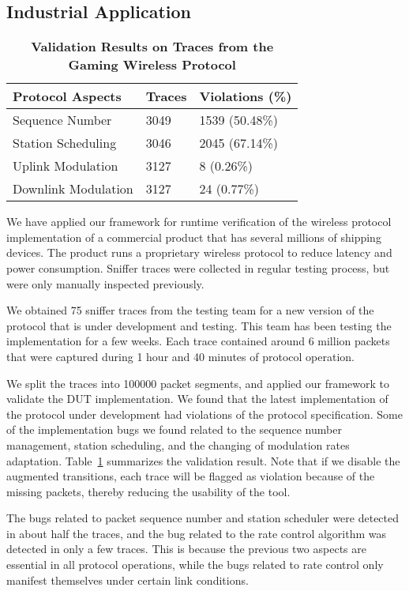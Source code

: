 \subsection{Industrial Application}
\label{subsec:xbox}

\begin{table}[t!]
  \centering
  \begin{tabular}{lll}
    \toprule
    \textbf{Protocol Aspects} & \textbf{Traces} & \textbf{Violations (\%)}\\
    \midrule
    Sequence Number & 3049 & 1539 (50.48\%) \\
    Station Scheduling & 3046 & 2045 (67.14\%) \\
    Uplink Modulation & 3127 & 8 (0.26\%) \\
    Downlink Modulation & 3127 & 24 (0.77\%) \\
    \bottomrule
  \end{tabular}
  \caption{\textbf{Validation Results on Traces from the Gaming Wireless Protocol}}
  \label{tab:xbox}
\end{table}

We have applied our framework for runtime verification of the wireless protocol
implementation of a commercial product that has several millions of shipping
devices. The product runs a proprietary wireless protocol to reduce latency and
power consumption. Sniffer traces were collected in regular testing process, but
were only manually inspected previously. 

We obtained 75 sniffer traces from the testing team for a new version of the
protocol that is under development and testing. This team has been testing the
implementation for a few weeks.  Each trace contained around 6 million packets
that were captured during 1 hour and 40 minutes of protocol operation.

We split the traces into \num{100000} packet segments, and applied our framework
to validate the DUT implementation. We found that the latest implementation of
the protocol under development had violations of the protocol specification.
Some of the implementation bugs we found related to the sequence number
management, station scheduling, and the changing of modulation rates adaptation.
Table~\ref{tab:xbox} summarizes the validation result. Note that if we disable
the augmented transitions, each trace will be flagged as violation because of
the missing packets, thereby reducing the usability of the tool.

The bugs related to packet sequence number and station scheduler were detected
in about half the traces, and the bug related to the rate control algorithm was
detected in only a few traces. This is because the previous two aspects are
essential in all protocol operations, while the bugs related to rate control
only manifest themselves under certain link conditions.

